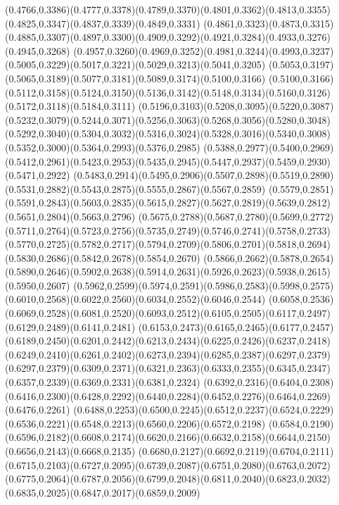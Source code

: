 (0.4766,0.3386)(0.4777,0.3378)(0.4789,0.3370)(0.4801,0.3362)(0.4813,0.3355)(0.4825,0.3347)(0.4837,0.3339)(0.4849,0.3331)
(0.4861,0.3323)(0.4873,0.3315)(0.4885,0.3307)(0.4897,0.3300)(0.4909,0.3292)(0.4921,0.3284)(0.4933,0.3276)(0.4945,0.3268)
(0.4957,0.3260)(0.4969,0.3252)(0.4981,0.3244)(0.4993,0.3237)(0.5005,0.3229)(0.5017,0.3221)(0.5029,0.3213)(0.5041,0.3205)
(0.5053,0.3197)(0.5065,0.3189)(0.5077,0.3181)(0.5089,0.3174)(0.5100,0.3166)
\PST@Solid(0.5100,0.3166)(0.5112,0.3158)(0.5124,0.3150)(0.5136,0.3142)(0.5148,0.3134)(0.5160,0.3126)(0.5172,0.3118)(0.5184,0.3111)
(0.5196,0.3103)(0.5208,0.3095)(0.5220,0.3087)(0.5232,0.3079)(0.5244,0.3071)(0.5256,0.3063)(0.5268,0.3056)(0.5280,0.3048)
(0.5292,0.3040)(0.5304,0.3032)(0.5316,0.3024)(0.5328,0.3016)(0.5340,0.3008)(0.5352,0.3000)(0.5364,0.2993)(0.5376,0.2985)
(0.5388,0.2977)(0.5400,0.2969)(0.5412,0.2961)(0.5423,0.2953)(0.5435,0.2945)(0.5447,0.2937)(0.5459,0.2930)(0.5471,0.2922)
(0.5483,0.2914)(0.5495,0.2906)(0.5507,0.2898)(0.5519,0.2890)(0.5531,0.2882)(0.5543,0.2875)(0.5555,0.2867)(0.5567,0.2859)
(0.5579,0.2851)(0.5591,0.2843)(0.5603,0.2835)(0.5615,0.2827)(0.5627,0.2819)(0.5639,0.2812)(0.5651,0.2804)(0.5663,0.2796)
(0.5675,0.2788)(0.5687,0.2780)(0.5699,0.2772)(0.5711,0.2764)(0.5723,0.2756)(0.5735,0.2749)(0.5746,0.2741)(0.5758,0.2733)
(0.5770,0.2725)(0.5782,0.2717)(0.5794,0.2709)(0.5806,0.2701)(0.5818,0.2694)(0.5830,0.2686)(0.5842,0.2678)(0.5854,0.2670)
(0.5866,0.2662)(0.5878,0.2654)(0.5890,0.2646)(0.5902,0.2638)(0.5914,0.2631)(0.5926,0.2623)(0.5938,0.2615)(0.5950,0.2607)
(0.5962,0.2599)(0.5974,0.2591)(0.5986,0.2583)(0.5998,0.2575)(0.6010,0.2568)(0.6022,0.2560)(0.6034,0.2552)(0.6046,0.2544)
(0.6058,0.2536)(0.6069,0.2528)(0.6081,0.2520)(0.6093,0.2512)(0.6105,0.2505)(0.6117,0.2497)(0.6129,0.2489)(0.6141,0.2481)
(0.6153,0.2473)(0.6165,0.2465)(0.6177,0.2457)(0.6189,0.2450)(0.6201,0.2442)(0.6213,0.2434)(0.6225,0.2426)(0.6237,0.2418)
(0.6249,0.2410)(0.6261,0.2402)(0.6273,0.2394)(0.6285,0.2387)(0.6297,0.2379)
\PST@Solid(0.6297,0.2379)(0.6309,0.2371)(0.6321,0.2363)(0.6333,0.2355)(0.6345,0.2347)(0.6357,0.2339)(0.6369,0.2331)(0.6381,0.2324)
(0.6392,0.2316)(0.6404,0.2308)(0.6416,0.2300)(0.6428,0.2292)(0.6440,0.2284)(0.6452,0.2276)(0.6464,0.2269)(0.6476,0.2261)
(0.6488,0.2253)(0.6500,0.2245)(0.6512,0.2237)(0.6524,0.2229)(0.6536,0.2221)(0.6548,0.2213)(0.6560,0.2206)(0.6572,0.2198)
(0.6584,0.2190)(0.6596,0.2182)(0.6608,0.2174)(0.6620,0.2166)(0.6632,0.2158)(0.6644,0.2150)(0.6656,0.2143)(0.6668,0.2135)
(0.6680,0.2127)(0.6692,0.2119)(0.6704,0.2111)(0.6715,0.2103)(0.6727,0.2095)(0.6739,0.2087)(0.6751,0.2080)(0.6763,0.2072)
(0.6775,0.2064)(0.6787,0.2056)(0.6799,0.2048)(0.6811,0.2040)(0.6823,0.2032)(0.6835,0.2025)(0.6847,0.2017)(0.6859,0.2009)
